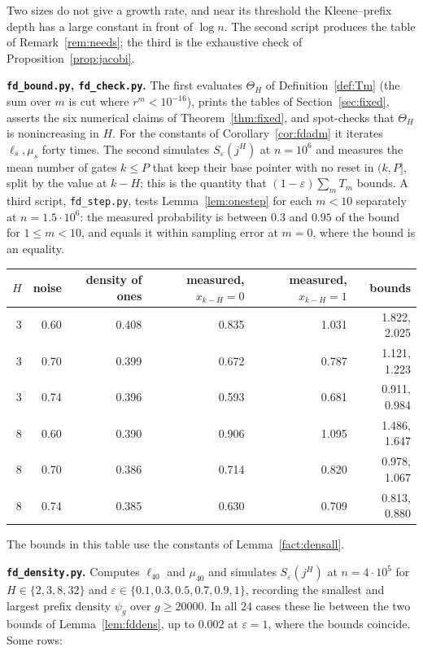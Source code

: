 \documentclass[11pt]{amsart}
\theoremstyle{definition}
\theoremstyle{remark}
\newcommand{\eps}{\varepsilon}
\begin{document}
\noindent Two sizes do not give a growth rate, and near its threshold the Kleene--prefix depth
has a large constant in front of $\log n$. The second script produces the table of
Remark~\ref{rem:needs}; the third is the exhaustive check of Proposition~\ref{prop:jacobi}.

\medskip\noindent\textbf{\texttt{fd\_bound.py}, \texttt{fd\_check.py}.} The first evaluates
$\Theta_H$ of Definition~\ref{def:Tm} (the sum over $m$ is cut where $r^{m}<10^{-16}$), prints the
tables of Section~\ref{sec:fixed}, asserts the six numerical claims of
Theorem~\ref{thm:fixed}, and spot-checks that $\Theta_H$ is nonincreasing in $H$. For the
constants of Corollary~\ref{cor:fdadm} it iterates $\ell_s,\mu_s$ forty times. The second
simulates $S_\eps(j^H)$ at $n=10^6$ and measures the mean number of gates $k\le P$ that keep their
base pointer with no reset in $(k,P]$, split by the value at $k-H$; this is the quantity that
$(1-\eps)\sum_mT_m$ bounds. A third script, \texttt{fd\_step.py}, tests Lemma~\ref{lem:onestep}
for each $m<10$ separately at $n=1.5\cdot10^6$: the measured probability is between $0.3$ and
$0.95$ of the bound for $1\le m<10$, and equals it within sampling error at $m=0$, where the
bound is an equality.

\begin{center}
\begin{tabular}{rrrrrr}
\toprule
$H$ & noise & density of ones & measured, $x_{k-H}=0$ & measured, $x_{k-H}=1$ & bounds\\
\midrule
3 & 0.60 & 0.408 & 0.835 & 1.031 & 1.822, 2.025\\
3 & 0.70 & 0.399 & 0.672 & 0.787 & 1.121, 1.223\\
3 & 0.74 & 0.396 & 0.593 & 0.681 & 0.911, 0.984\\
8 & 0.60 & 0.390 & 0.906 & 1.095 & 1.486, 1.647\\
8 & 0.70 & 0.386 & 0.714 & 0.820 & 0.978, 1.067\\
8 & 0.74 & 0.385 & 0.630 & 0.709 & 0.813, 0.880\\
\bottomrule
\end{tabular}
\end{center}

\noindent The bounds in this table use the constants of Lemma~\ref{fact:densall}.

\medskip\noindent\textbf{\texttt{fd\_density.py}.} Computes $\ell_{40}$ and $\mu_{40}$ and
simulates $S_\eps(j^H)$ at $n=4\cdot10^5$ for $H\in\{2,3,8,32\}$ and
$\eps\in\{0.1,0.3,0.5,0.7,0.9,1\}$, recording the smallest and largest prefix density $\psi_g$
over $g\ge20000$. In all $24$ cases these lie between the two bounds of
Lemma~\ref{lem:fddens}, up to $0.002$ at $\eps=1$, where the bounds coincide. Some rows:
\end{document}
